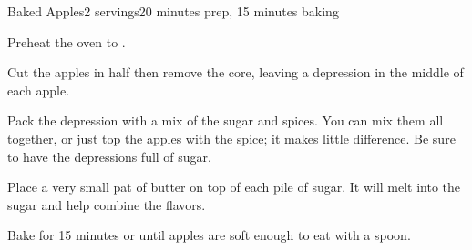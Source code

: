 \documentclass[../Cookbook.tex]{subfiles}
\begin{document}
\begin{recipe}{Baked Apples}{2 servings}{20 minutes prep, 15 minutes baking}

	Preheat the oven to .

	Cut the apples in half then remove the core, leaving a depression in the middle of each apple.

	Pack the depression with a mix of the sugar and spices. You can mix them all together, or just top the apples with the spice; it makes little difference. Be sure to have the depressions full of sugar.

	Place a very small pat of butter on top of each pile of sugar. It will melt into the sugar and help combine the flavors.

	Bake for 15 minutes or until apples are soft enough to eat with a spoon.

\end{recipe}
\end{document}
